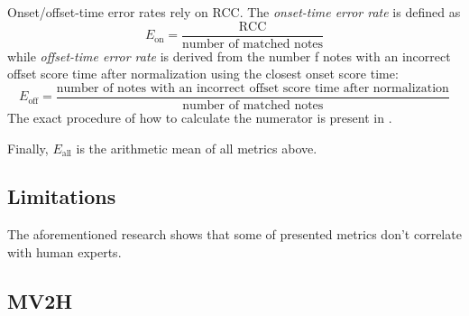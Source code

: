 Onset/offset-time error rates rely on RCC. The \emph{onset-time error rate} is defined as \[E_{\textrm{on}} = \frac{\textrm{RCC}}{\textrm{number of matched notes}}\] while \emph{offset-time error rate} is derived from the number f notes with an incorrect offset score time after normalization using the closest onset score time: \[E_{\textrm{off}} = \frac{\textrm{number of notes with an incorrect offset score time after normalization}}{\textrm{number of matched notes}}\] The exact procedure of how to calculate the numerator is present in \cite{Nakamura2017a}.

Finally, $E_{\textrm{all}}$ is the arithmetic mean of all metrics above.

\subsection{Limitations}

\missing

The aforementioned research \cite{Holzapfel2021} shows that some of presented metrics don't correlate with human experts. 

\subsection{MV2H}

\cite{McLeod2018}
